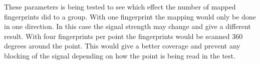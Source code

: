 These parameters is being tested to see which effect the number of mapped fingerprints did to a group.
With one fingerprint the mapping would only be done in one direction.
In this case the signal strength may change and give a different result.
With four fingerprints per point the fingerprints would be scanned 360 degrees around the point. 
This would give a better coverage and prevent any blocking of the signal depending on how the point is being read in the test.

